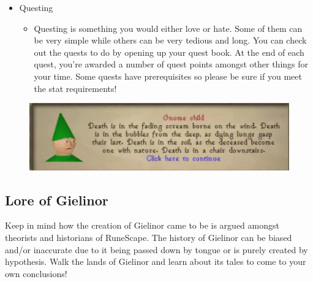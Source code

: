 \documentclass{article}
\newlength\myheight
\newlength\mydepth
\newcommand*\inlinegraphics[1]{%
  \settototalheight\myheight{Xygp}%
  \settodepth\mydepth{Xygp}%
  \raisebox{-\mydepth}{\texttt{[image: \#1]}}%
}
\begin{document}
{\begin{itemize}
\begin{itemize}
\begin{itemize}
            \item Attack, Strength, Defense, and Range are all types of fighting styles you can perform. Each style plays a different role in your stats. 
            \item Mage is another class of combat you can train on. All you need is a staff and runes to cast spells and you'll be on your way!
            \item Prayer isn't necessarily a combat staff but is there to aid you in combat with different buffs and debuffs granted as you level up. This can be achieved by burying bones. 
            \item Hitpoints refers to how much health points you have. As you level up your combat, your hitpoints also level up on their own speed. 
        \end{itemize}
    \end{itemize}
    \item Questing \inlinegraphics{quest}
    \begin{itemize}
        \item 
Questing is something you would either love or hate. Some of them can be very simple while others can be very tedious and long. You can check out the quests to do by opening up your quest book. At the end of each quest, you're awarded a number of quest points amongst other things for your time. Some quests have prerequisites so please be sure if you meet the stat requirements!
    \end{itemize}
\end{itemize}}
\begin{figure}[b!]
    \centering
    \includegraphics{gno.png}
\end{figure}
\newpage 
\begin{center}
\section{Lore of Gielinor}
\noindent \tiny *Keep in mind how the creation of Gielinor came to be is argued amongst theorists and historians of RuneScape. The history of Gielinor can be biased and/or inaccurate due to it being passed down by tongue or is purely created by hypothesis. Walk the lands of Gielinor and learn about its tales to come to your own conclusions!
\end{center}
\end{document}

